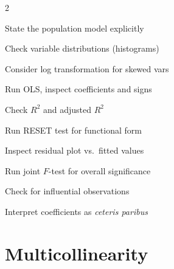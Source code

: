 \documentclass[10pt,a4paper]{article}
\begin{document}
\begin{tcolorbox}[checklist]
\begin{multicols}{2}
\begin{checklist}
  \item State the population model explicitly
  \item Check variable distributions (histograms)
  \item Consider log transformation for skewed vars
  \item Run OLS, inspect coefficients and signs
  \item Check $R^2$ and adjusted $R^2$
  \item Run RESET test for functional form
  \item Inspect residual plot vs.\ fitted values
  \item Run joint $F$-test for overall significance
  \item Check for influential observations
  \item Interpret coefficients as \textit{ceteris paribus}
\end{checklist}
\end{multicols}
\end{tcolorbox}

\section{Multicollinearity}
\end{document}
